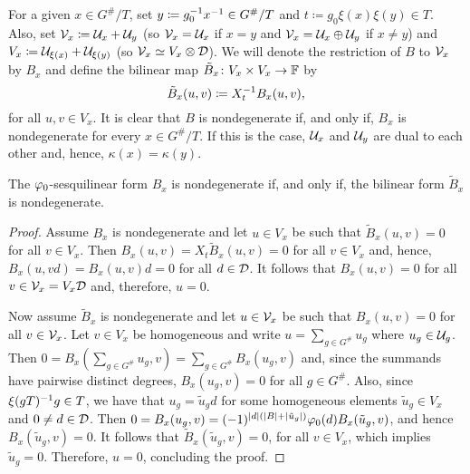 For a given $x \in G^\#/T$, set $y \coloneqq g_0^{-1} x^{-1} \in G^\#/T$ and $t \coloneqq g_0 \xi(x) \xi(y) \in T$.
Also, set $\mathcal V_x \coloneqq \mathcal U_x + \mathcal U_y$ (so $\mathcal V_x = \mathcal U_x$ if $x=y$ and $\mathcal V_x = \mathcal U_x \oplus \mathcal U_y$ if $x \neq y$) and $V_x \coloneqq \mathcal U_{\xi(x)} + \mathcal U_{\xi(y)}$ (so $\mathcal V_x \simeq V_x \otimes \mathcal{D}$).
We will denote the restriction of $B$ to $\mathcal V_x$ by $B_x$ and define the bilinear map $\tilde{B}_x\colon V_x \times V_x \to \mathbb{F}$ by
\begin{equation}\label{eq:B_x-tilde}
	\tilde{B}_x (u,v) \coloneqq X_{t}^{-1} B_x (u,v),
\end{equation}
for all $u,v \in V_x$.
It is clear that $B$ is nondegenerate if, and only if, $B_x$ is nondegenerate for every $x \in G^\#/T$.
If this is the case, $\mathcal U_x$ and $\mathcal U_y$ are dual to each other and, hence, $\kappa(x) = \kappa(y)$.

\begin{lemma}\label{lemma:B_x-nondeg}
	The $\varphi_0$-sesquilinear form $B_x$ is nondegenerate if, and only if, the bilinear form $\tilde{B}_x$ is nondegenerate.
\end{lemma}

\begin{proof}
	Assume $B_x$ is nondegenerate and let $u \in V_x$ be such that $\tilde{B}_x(u,v) = 0$ for all $v \in V_x$.
	Then $B_x(u, v) = X_{t} \tilde{B}_x(u,v) = 0$ for all $v \in V_x$ and, hence, $B_x(u, vd) = B_x(u, v)d = 0$ for all $d \in \mathcal{D}$.
	It follows that $B_x(u,v) = 0$ for all $v\in \mathcal V_x = V_x \mathcal{D}$ and, therefore, $u = 0$.

	Now assume $\tilde{B}_x$ is nondegenerate and let $u \in \mathcal V_x$ be such that $B_x (u,v) = 0$ for all $v \in \mathcal V_x$.
	Let $v\in V_x$ be homogeneous and write $u = \sum_{g\in G^\#} u_g$ where $u_g \in \mathcal U_g$.
	Then $0 = B_x(\sum_{g\in G^\#} u_g, v) = \sum_{g\in G^\#} B_x(u_g, v)$ and, since the summands have pairwise distinct degrees, $B_x(u_g, v) = 0$ for all $g\in G^\#$.
	Also, since $\xi(gT)^{-1} g \in T$, we have that $u_g = \tilde u_g d$ for some homogeneous elements $\tilde u_g \in V_x$ and $0 \neq d \in \mathcal{D}$.
	Then $0 = B_x(u_g, v) = (-1)^{|d|(|B| + |\tilde u_g|)} \varphi_0(d) B_x(\tilde u_g, v)$, and hence $B_x(\tilde u_g, v) = 0$.
	It follows that $\tilde{B}_x(\tilde u_g, v) = 0$, for all $v\in V_x$, which implies $\tilde u_g = 0$.
	Therefore, $u = 0$, concluding the proof.
\end{proof}

